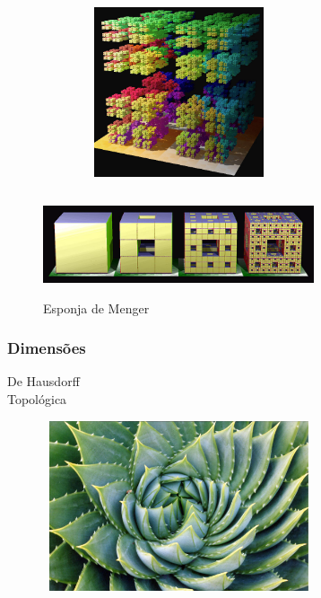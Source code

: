 \documentclass{beamer}
\begin{document}
\begin{frame}
	\begin{figure}[htb]
	\centering
    	    \includegraphics[width=8cm, height=5cm]{images/cs2.jpg}
       	        \vspace{0.01em}
	\end{figure}
\end{frame}
\begin{frame}
	\begin{figure}[htb]
	\centering
    	    \includegraphics[width=8cm, height=3cm]{images/sponge.jpg}
       	        \vspace{0.01em}
       	 \caption{Esponja de Menger}
	\end{figure}
\end{frame}
\begin{frame}
    \frametitle{Dimensões}
    \centering
        De Hausdorff \\
        Topológica
\end{frame}
\begin{frame}
	\begin{figure}[htb]
	\centering
    	    \includegraphics[width=8cm, height=5cm]{images/nat1.jpg}
       	        \vspace{0.01em}
	\end{figure}
\end{frame}
\end{document}
